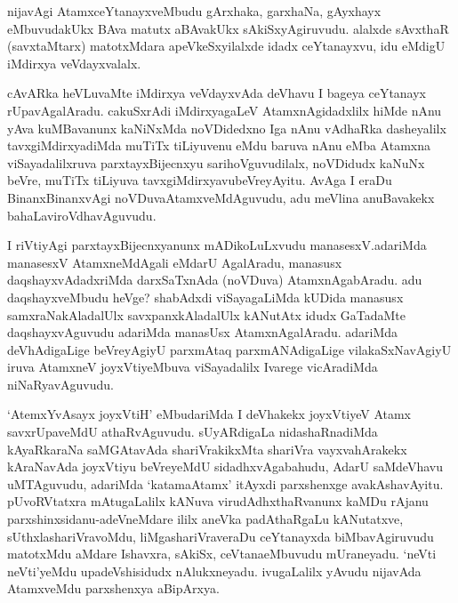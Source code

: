 \begin{artha}
nijavAgi AtamxceYtanayxveMbudu gArxhaka, garxhaNa, gAyxhayx eMbuvudakUkx BAva matutx aBAvakUkx sAkiSxyAgiruvudu. alalxde sAvxthaR (savxtaMtarx) matotxMdara apeVkeSxyilalxde idadx ceYtanayxvu, idu eMdigU iMdirxya veVdayxvalalx. 
\end{artha}


\begin{artha}
cAvARka heVLuvaMte iMdirxya veVdayxvAda deVhavu I bageya ceYtanayx rUpavAgalAradu. cakuSxrAdi iMdirxyagaLeV AtamxnAgidadxlilx hiMde nAnu yAva kuMBavanunx kaNiNxMda noVDidedxno Iga nAnu vAdhaRka dasheyalilx tavxgiMdirxyadiMda muTiTx tiLiyuvenu eMdu baruva nAnu eMba Atamxna viSayadalilxruva parxtayxBijecnxyu sarihoVguvudilalx, noVDidudx kaNuNx beVre, muTiTx tiLiyuva tavxgiMdirxyavu\break beVreyAyitu. AvAga I eraDu BinanxBinanxvAgi noVDuva\break AtamxveMdAguvudu, adu meVlina anuBavakekx bahaLa\break viroVdhavAguvudu.  
\end{artha}


\begin{artha}
I riVtiyAgi parxtayxBijecnxyanunx mADikoLuLxvudu manasesxV.\break adariMda manasesxV AtamxneMdAgali eMdarU AgalAradu, manasusx daqshayxvAdadxriMda darxSaTxnAda (noVDuva) AtamxnAgabAradu. adu daqshayxveMbudu heVge? shabAdxdi viSayagaLiMda kUDida manasusx samxraNakAladalUlx savxpanxkAladalUlx kANutAtx idudx GaTadaMte daqshayxvAguvudu adariMda manasUsx AtamxnAgalAradu. adariMda deVhAdigaLige beVreyAgiyU parxmAtaq parxmANAdigaLige vilakaSxNavAgiyU iruva AtamxneV joyxVtiyeMbuva viSayadalilx Ivarege vicAradiMda niNaRyavAguvudu.
\end{artha}


\begin{artha}
`AtemxYvAsayx joyxVtiH' eMbudariMda I deVhakekx joyxVtiyeV Atamx savxrUpaveMdU athaRvAguvudu. sUyARdigaLa nidashaRnadiMda kAyaRkaraNa saMGAtavAda shariVrakikxMta shariVra vayxvahArakekx kAraNavAda joyxVtiyu beVreyeMdU sidadhxvAgabahudu, AdarU saMdeVhavu uMTAguvudu, adariMda `katamaAtamx' itAyxdi parxshenxge avakAshavAyitu. pUvoRVtatxra mAtugaLalilx kANuva virudAdhxthaRvanunx kaMDu rAjanu parxshinxsidanu-adeVneMdare ililx aneVka padAthaRgaLu kANutatxve, sUthxlashariVravoMdu, liMgashariVraveraDu ceYtanayxda biMbavAgiruvudu matotxMdu aMdare Ishavxra, sAkiSx, ceVtana\break eMbuvudu mUraneyadu. `neVti neVti'yeMdu upadeVshisidudx nAlukxneyadu. ivugaLalilx yAvudu nijavAda AtamxveMdu parxshenxya aBipArxya. 
\end{artha}

